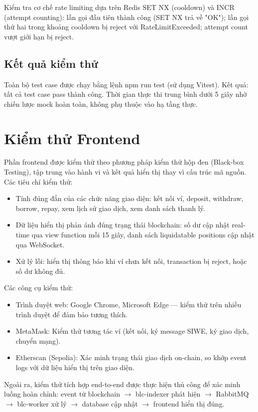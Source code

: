 \documentclass[../DoAn.tex]{subfiles}
\begin{document}
Kiểm tra cơ chế rate limiting dựa trên Redis SET NX (cooldown) và INCR (attempt counting): lần gọi đầu tiên thành công (SET NX trả về "OK"); lần gọi thứ hai trong khoảng cooldown bị reject với RateLimitExceeded; attempt count vượt giới hạn bị reject.

\subsection{Kết quả kiểm thử}


Toàn bộ test case được chạy bằng lệnh npm run test (sử dụng Vitest). Kết quả: tất cả test case pass thành công. Thời gian thực thi trung bình dưới 5 giây nhờ chiến lược mock hoàn toàn, không phụ thuộc vào hạ tầng thực.

\section{Kiểm thử Frontend}


Phần frontend được kiểm thử theo phương pháp kiểm thử hộp đen (Black-box Testing), tập trung vào hành vi và kết quả hiển thị thay vì cấu trúc mã nguồn. Các tiêu chí kiểm thử:

\begin{itemize}
  \item Tính đúng đắn của các chức năng giao diện: kết nối ví, deposit, withdraw, borrow, repay, xem lịch sử giao dịch, xem danh sách thanh lý.
  \item Dữ liệu hiển thị phản ánh đúng trạng thái blockchain: số dư cập nhật real-time qua view function mỗi 15 giây, danh sách liquidatable positions cập nhật qua WebSocket.
  \item Xử lý lỗi: hiển thị thông báo khi ví chưa kết nối, transaction bị reject, hoặc số dư không đủ.
\end{itemize}


Các công cụ kiểm thử:

\begin{itemize}
  \item Trình duyệt web: Google Chrome, Microsoft Edge --- kiểm thử trên nhiều trình duyệt để đảm bảo tương thích.
  \item MetaMask: Kiểm thử tương tác ví (kết nối, ký message SIWE, ký giao dịch, chuyển mạng).
  \item Etherscan (Sepolia): Xác minh trạng thái giao dịch on-chain, so khớp event logs với dữ liệu hiển thị trên giao diện.
\end{itemize}


Ngoài ra, kiểm thử tích hợp end-to-end được thực hiện thủ công để xác minh luồng hoàn chỉnh: event từ blockchain $\rightarrow$ blc-indexer phát hiện $\rightarrow$ RabbitMQ $\rightarrow$ blc-worker xử lý $\rightarrow$ database cập nhật $\rightarrow$ frontend hiển thị đúng.
\end{document}
